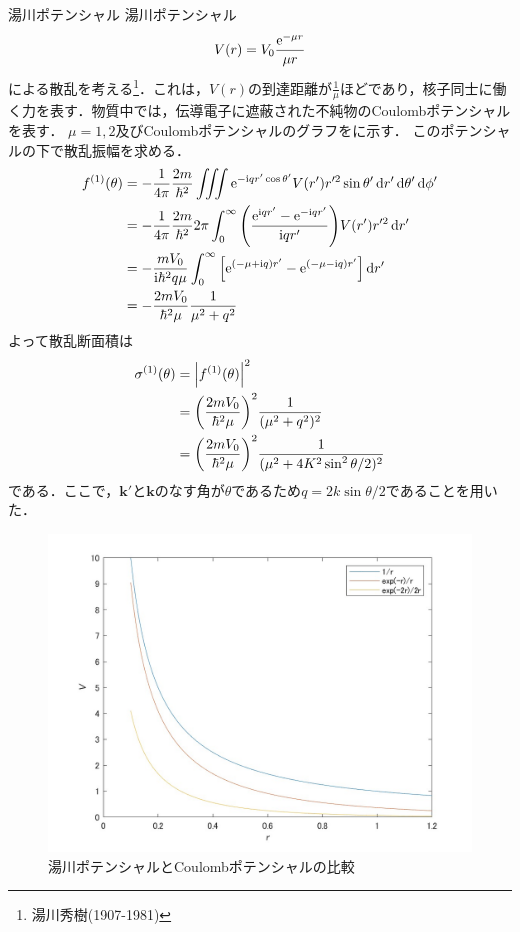 \documentclass{report}
\begin{document}
 \begin{myex}{湯川ポテンシャル}{}
湯川ポテンシャル
\begin{align}
  V(r) = V_0 \frac{\mathrm{e}^{-\mu r}}{\mu r}
\end{align}
による散乱を考える\footnote{湯川秀樹(1907-1981)}．これは，$V(r)$の到達距離が$\frac{1}{\mu}$ほどであり，核子同士に働く力を表す．物質中では，伝導電子に遮蔽された不純物のCoulombポテンシャルを表す．
$\mu = 1,2$及びCoulombポテンシャルのグラフをに示す．
このポテンシャルの下で散乱振幅を求める．
\begin{align}
  f^{(1)}(\theta) &= -\frac{1}{4\pi} \frac{2m}{\hbar^2} \iiint \mathrm{e}^{-\mathrm{i} qr'\cos\theta'}V(r') r'^2 \sin\theta'\dd{r'}\dd{\theta'}\dd{\phi'}\\
  &= -\frac{1}{4\pi}\frac{2m}{\hbar^2} 2\pi \int_{0}^{\infty} \qty(\frac{\mathrm{e}^{\mathrm{i} qr'} - \mathrm{e}^{-\mathrm{i} qr'}}{\mathrm{i} qr'})V(r') r'^2 \dd{r'}\\
  &= -\frac{mV_0}{\mathrm{i} \hbar^2 q \mu} \int_{0}^{\infty} \qty[\mathrm{e}^{(-\mu + \mathrm{i} q)r'} - \mathrm{e}^{(-\mu - \mathrm{i} q)r'}] \dd{r'}\\
  &= - \frac{2m V_0}{\hbar^2 \mu} \frac{1}{\mu^2 + q^2}
\end{align}
よって散乱断面積は
\begin{align}
  \sigma^{(1)}(\theta) &= \abs{f^{(1)}(\theta)}^2\\
  &= \qty(\frac{2m V_0}{\hbar^2 \mu})^2 \frac{1}{(\mu^2 + q^2)^2}\\
  &= \qty(\frac{2m V_0}{\hbar^2 \mu})^2 \frac{1}{(\mu^2 + 4K^2 \sin^2\theta/2)^2}
\end{align}
である．ここで，$\bm{k'}$と$\bm{k}$のなす角が$\theta$であるため$q = 2k\sin\theta/2$であることを用いた．

\begin{figure}[H]
  \centering
  \includegraphics[width = 0.6\columnwidth]{fig/yukawa_potential.jpg}
  \caption{湯川ポテンシャルとCoulombポテンシャルの比較}\label{yukawa-potential-graph}
\end{figure}

 \end{myex}
\end{document}
